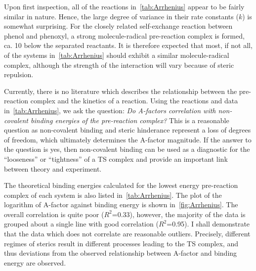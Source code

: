 Upon first inspection, all of the reactions in~\ref{tab:Arrhenius} appear to be fairly similar in nature. Hence, the large degree of variance in their rate constants ($k$) is somewhat surprising. For the closely related self-exchange reaction between phenol and phenoxyl,\cite{Mayer2002} a strong molecule-radical pre-reaction complex is formed, ca. 10 \kcalmol below the separated reactants. It is therefore expected that most, if not all, of the systems in~\ref{tab:Arrhenius} should exhibit a similar molecule-radical complex, although the strength of the interaction will vary because of steric repulsion.

Currently, there is no literature which describes the relationship between the pre-reaction complex and the kinetics of a reaction. Using the reactions and data in~\ref{tab:Arrhenius}, we ask the question: \emph{Do A-factors correlation with non-covalent binding energies of the pre-reaction complex?} This is a reasonable question as non-covalent binding and steric hinderance represent a loss of degrees of freedom, which ultimately determines the A-factor magnitude. If the answer to the question is yes, then non-covalent binding can be used as a diagnostic for the ``looseness'' or ``tightness'' of a TS complex and provide an important link between theory and experiment.

The theoretical binding energies calculated for the lowest energy pre-reaction complex of each system is also listed in~\ref{tab:Arrhenius}. The plot of the logarithm of A-factor against binding energy is shown in~\ref{fig:Arrhenius}. The overall correlation is quite poor ($R^2$=0.33), however, the majority of the data is grouped about a single line with good correlation ($R^2$=0.95). I shall demonstrate that the data which does not correlate are reasonable outliers. Precisely, different regimes of sterics result in different processes leading to the TS complex, and thus deviations from the observed relationship between A-factor and binding energy are observed.

% 
